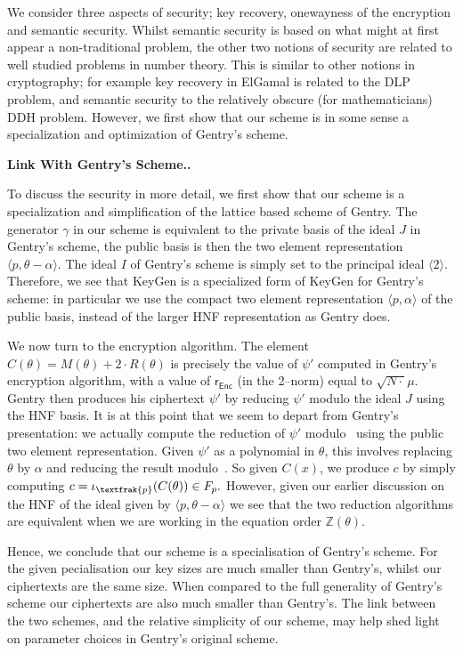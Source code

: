 \documentclass[a4paper, 12pt]{article}
\newcommand{\ndash}{\nobreakdash --}
\newcommand{\bb}[1]{\mathbb{#1}}
\newcommand{\tfr}[1]{\textfrak{#1}}
\newcommand{\tsf}[1]{\textsf{#1}}
\newcommand{\tbf}[1]{\textbf{#1}}
\newenvironment{bparagraph}[1]{
	\vspace{2ex}\noindent\tbf{#1. }\nolinebreak 
}{\vspace{2ex}}
\begin{document}
	We consider three aspects of security; key recovery, onewayness of the encryption and semantic security. 
	Whilst semantic security is based on what might at first appear a non-traditional problem, the other two notions of security are related to well studied problems in number theory. 
	This is similar to other notions in cryptography; for example key recovery in ElGamal is related to the DLP problem,
	and semantic security to the relatively obscure (for mathematicians) DDH problem. 
	However, we first show that our scheme is in some sense a specialization and optimization of Gentry's scheme.
	
	\begin{bparagraph}{Link With Gentry's Scheme.}
		To discuss the security in more detail, we first show that our scheme is a specialization and simplification of the lattice based scheme of Gentry. 
		The generator $\gamma$ in our scheme is  equivalent to the private basis of the ideal $J$ in Gentry's scheme, the public basis is then the two element  representation $\langle p, \theta - \alpha \rangle$. 
		The ideal $I$ of Gentry's scheme is simply set to the principal ideal $\langle 2 \rangle$. 
		Therefore, we see that KeyGen is a specialized form of KeyGen for Gentry's scheme: in particular we use the compact two element representation $\langle p, \alpha \rangle$ of the public basis, instead of the larger HNF  representation as Gentry does.
		
		We now turn to the encryption algorithm. 
		The element $C(\theta) = M(\theta) + 2 \cdot R(\theta)$
		is precisely the value of $\psi '$ computed in Gentry's encryption algorithm, with a value of $\tsf{r}_\tsf{Enc}$ (in the 2\ndash norm) equal to $\sqrt{N \cdot} \mu$.
		Gentry then produces his ciphertext	$\psi '$ by reducing $\psi '$ modulo the ideal $J$ using the HNF basis.
		It is at this point	that we seem to depart from Gentry's presentation: we actually compute the reduction of $\psi '$ modulo~\tfr{p} using the public two element representation.
		Given $\psi '$ as a polynomial in $\theta$, this involves replacing $\theta$ by $\alpha$ and reducing the result
		modulo~\tfr{p}. So given $C(x)$, we produce $c$ by simply computing $c = \iota_\tfr{p}(C(\theta)) \in F_p.$
		However, given our earlier discussion on the HNF of the ideal given by $\langle p, \theta - \alpha \rangle$	we see that the two reduction algorithms are equivalent when we are working in	the equation order $\bb{Z}(\theta)$.
		
		Hence, we conclude that our scheme is a specialisation of Gentry's scheme. 
		For the given pecialisation our key sizes are much smaller than Gentry's, whilst our ciphertexts are the same size. When compared to the full generality of Gentry's scheme our ciphertexts are also much smaller than Gentry's. 
		The link between the two schemes, and the relative simplicity of our scheme, may help shed light on parameter choices in Gentry's original scheme.
	\end{bparagraph}
	
\end{document}
